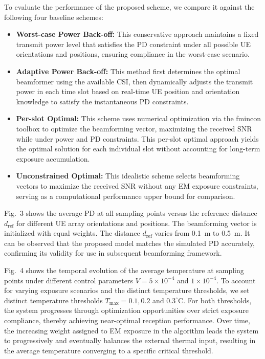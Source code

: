 \documentclass[journal]{IEEEtran}
\begin{document}
To evaluate the performance of the proposed scheme, we compare it against the following four baseline schemes:
\begin{itemize}
    \item \textbf{Worst-case Power Back-off:} This conservative approach maintains a fixed transmit power level that satisfies the PD constraint under all possible UE orientations and positions, ensuring compliance in the worst-case scenario.

    \item \textbf{Adaptive Power Back-off:} This method first determines the optimal beamformer using the available CSI, then dynamically adjusts the transmit power in each time slot based on real-time UE position and orientation knowledge to satisfy the instantaneous PD constraints.

    \item \textbf{Per-slot Optimal:} This scheme uses numerical optimization via the fmincon toolbox to optimize the beamforming vector, maximizing the received SNR while under power and PD constraints. This per-slot optimal approach yields the optimal solution for each individual slot without accounting for long-term exposure accumulation.

    \item \textbf{Unconstrained Optimal:} This idealistic scheme selects beamforming vectors to maximize the received SNR without any EM exposure constraints, serving as a computational performance upper bound for comparison.
\end{itemize}

Fig.~3 shows the average PD at all sampling points versus the reference distance $d_{\mathrm{ref}}$ for different UE array orientations and positions. The beamforming vector is initialized with equal weights. The distance $d_{\mathrm{ref}}$ varies from 0.1~m to 0.5~m. It can be observed that the proposed model matches the simulated PD accurately, confirming its validity for use in subsequent beamforming framework.

Fig.~4 shows the temporal evolution of the average temperature at sampling points under different control parameters $V = 5 \times 10^{-4}$ and $1 \times 10^{-4}$. To account for varying exposure scenarios and the distinct temperature thresholds, we set distinct temperature thresholds $T_{\max} = 0.1, 0.2$ and $0.3^\circ$C. For both thresholds, the system progresses through optimization opportunities over strict exposure compliance, thereby achieving near-optimal reception performance. Over time, the increasing weight assigned to EM exposure in the algorithm leads the system to progressively and eventually balances the external thermal input, resulting in the average temperature converging to a specific critical threshold.
\end{document}

